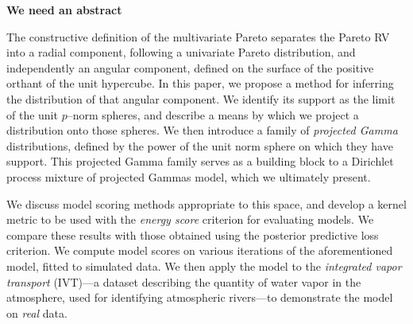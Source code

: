 {\bf We need an abstract}

The constructive definition of the multivariate Pareto separates the Pareto RV into
    a radial component, following a univariate Pareto distribution, and independently
    an angular component, defined on the surface of the positive orthant of the unit 
    hypercube.  In this paper, we 
    propose a method for inferring the distribution of that angular component.  We  
    identify its support as the limit of the unit $p$--norm
    spheres, and describe a means by which we project a distribution onto those spheres.
    We then introduce a family of \emph{projected Gamma} distributions, defined by the
    power of the unit norm sphere on which they have support.  This projected Gamma family
    serves as a building block to a Dirichlet process mixture of projected Gammas model,
    which we ultimately present.

We discuss model scoring methods appropriate to this space, and develop a kernel metric
    to be used with the \emph{energy score} criterion for evaluating models.  We compare
    these results with those obtained using the posterior predictive loss criterion.  
    We compute model scores
    on various iterations of the aforementioned model, fitted to simulated data.  We then
    apply the model to the \emph{integrated vapor transport} (IVT)---a dataset describing 
    the quantity of water vapor in the atmosphere, used for identifying atmospheric 
    rivers---to demonstrate the model on \emph{real} data.

